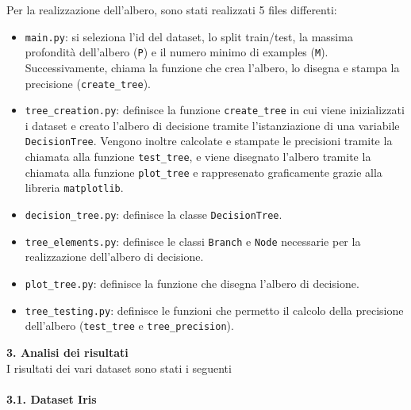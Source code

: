\documentclass{article}
\begin{document}
Per la realizzazione dell'albero, sono stati realizzati 5 files differenti:
\begin{itemize}
	\item \texttt{main.py}: si seleziona l'id del dataset, lo split train/test, la massima profondità dell'albero (\texttt{P}) e il numero minimo di examples (\texttt{M}). Successivamente, chiama la funzione che crea l'albero, lo disegna e stampa la precisione (\texttt{create\_tree}).
	\item \texttt{tree\_creation.py}: definisce la funzione \texttt{create\_tree} in cui viene inizializzati i dataset e creato l'albero di decisione tramite l'istanziazione di una variabile \texttt{DecisionTree}. Vengono inoltre calcolate e stampate le precisioni tramite la chiamata alla funzione \texttt{test\_tree}, e viene disegnato l'albero tramite la chiamata alla funzione \texttt{plot\_tree} e rappresenato graficamente grazie alla libreria \texttt{matplotlib}.
	\item \texttt{decision\_tree.py}: definisce la classe \texttt{DecisionTree}.
	\item \texttt{tree\_elements.py}: definisce le classi \texttt{Branch} e \texttt{Node} necessarie per la realizzazione dell'albero di decisione.
	\item \texttt{plot\_tree.py}: definisce la funzione che disegna l'albero di decisione.
	\item \texttt{tree\_testing.py}: definisce le funzioni che permetto il calcolo della precisione dell'albero (\texttt{test\_tree} e \texttt{tree\_precision}).
\end{itemize}
{\Large \textbf{3. Analisi dei risultati}}\\
I risultati dei vari dataset sono stati i seguenti\\
\\
{\Large \textbf{{\large{3}}.{\small{1}}. Dataset Iris}}\\
\end{document}
